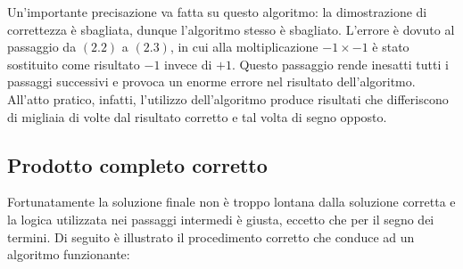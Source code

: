 \documentclass[Lau,oneside]{sapthesis}
\begin{document}
Un'importante precisazione va fatta su questo algoritmo: la dimostrazione di correttezza è sbagliata, dunque l'algoritmo stesso è sbagliato. L'errore è dovuto al passaggio da $(2.2)$ a $(2.3)$, in cui alla moltiplicazione $-1 \times -1$ è stato sostituito come risultato $-1$ invece di $+1$. Questo passaggio rende inesatti tutti i passaggi successivi e provoca un enorme errore nel risultato dell'algoritmo. All'atto pratico, infatti, l'utilizzo dell'algoritmo produce risultati che differiscono di migliaia di volte dal risultato corretto e tal volta di segno opposto.


\subsection{Prodotto completo corretto}
Fortunatamente la soluzione finale non è troppo lontana dalla soluzione corretta e la logica utilizzata nei passaggi intermedi è giusta, eccetto che per il segno dei termini. Di seguito è illustrato il procedimento corretto che conduce ad un algoritmo funzionante:
\end{document}
